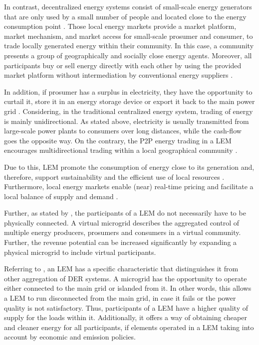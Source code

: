 In contrast, decentralized energy systems consist of small-scale energy generators that are 
only used by a small number of people and located close to the energy consumption point .
Those local energy markets provide a market platform, market mechanism, and market access
for small-scale prosumer and consumer, to trade locally generated energy within their community.
In this case, a community presents a group of geographically and socially close energy agents.
Moreover, all participants buy or sell energy directly with each other by using the provided market platform
without intermediation by conventional energy suppliers .

In addition, if prosumer has a surplus in electricity, they have the opportunity 
to curtail it, store it in an energy storage device or export it back to the main power grid .
Considering, in the traditional centralized energy system, trading of energy is mainly unidirectional.
As stated above, electricity is usually transmitted from large-scale power plants to 
consumers over long distances, while the cash-flow goes the opposite way. 
On the contrary, the P2P energy trading in a LEM encourages multidirectional trading within 
a local geographical community .

Due to this, LEM promote the consumption of energy close to its generation and, therefore, 
support sustainability and the efficient use of local resources .
Furthermore, local energy markets enable (near) real-time pricing and facilitate a local balance
of supply and demand . 

Further, as stated by ,
the participants of a LEM do not necessarily have to be physically connected. A virtual microgrid
describes the aggregated control of multiple energy producers, prosumers and consumers in a virtual 
community. Further, the revenue potential can be increased significantly by expanding a physical 
microgrid to include virtual participants. 

Referring to , an LEM has a specific characteristic
that distinguishes it from other aggregation of DER systems. A microgrid has the opportunity
to operate either connected to the main grid or islanded from it. In other words,
this allows a LEM to run disconnected from the main grid, in case it fails or 
the power quality is not satisfactory. Thus, participants of a LEM have a higher quality 
of supply for the loads within it. Additionally, it offers a way of obtaining cheaper 
and cleaner energy for all participants, if elements operated in a LEM taking into 
account by economic and emission policies.

